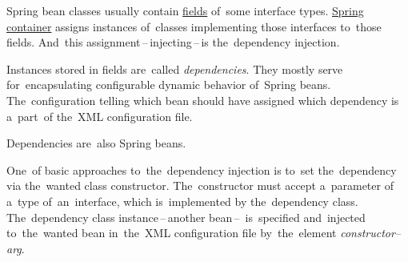 \label{dependencyinjection}
Spring bean classes usually contain \hyperref[variablefieldproperty]{fields} of~some interface types. \hyperref[springcontainrer]{Spring container} assigns instances of~classes implementing those interfaces to~those fields. And~this assignment\,--\,injecting\,--\,is the~dependency injection.

Instances stored in fields are~called \textit{dependencies}. They mostly serve for~encapsulating configurable dynamic behavior of~Spring beans. The~configuration telling which bean should have assigned which dependency is a~part~of the~XML configuration file.

\note Dependencies are~also Spring beans.

\label{constructorinjection}
One~of basic approaches to~the~dependency injection is to~set the~dependency via the~wanted class constructor. The~constructor must accept a~parameter of a~type of~an~interface, which is~implemented by the~dependency class. The~dependency class instance\,--\,another bean\,--\, is~specified and~injected to~the~wanted bean in~the~XML configuration file by~the~element \textit{constructor--arg}.


